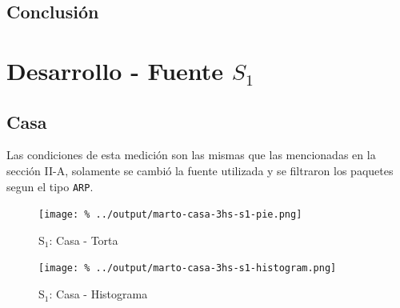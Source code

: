 \documentclass[final,inline,a4paper,narroweqnarray]{ieee}
\begin{document}
    \subsection{Conclusión}




\section{Desarrollo - Fuente $S_1$}
  \subsection{Casa}

  Las condiciones de esta medición son las mismas que las mencionadas en la
  sección II-A, solamente se cambió la fuente utilizada y se filtraron los
  paquetes segun el tipo \texttt{ARP}.

    \begin{figure}[ht]\begin{center}
      \texttt{[image: \%
      ../output/marto-casa-3hs-s1-pie.png]}
      \vspace{-2em}
      \caption{S$_1$: Casa - Torta}
      \label{marto-casa-3hs-s1-pie}
    \end{center}\end{figure}

    \begin{figure}[ht]\begin{center}
      \texttt{[image: \%
      ../output/marto-casa-3hs-s1-histogram.png]}
      \vspace{-2em}
      \caption{S$_1$: Casa - Histograma}
      \label{marto-casa-3hs-s1-histogram}
    \end{center}\end{figure}	
\end{document}
